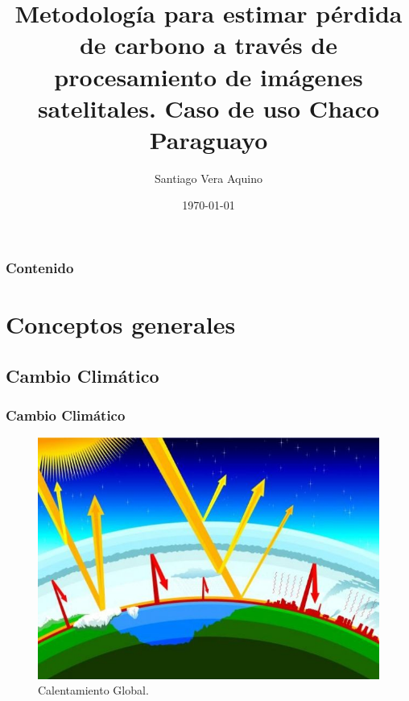 \documentclass[xcolor=table]{beamer}
\title[Perdida de Carbono]{Metodolog\'ia para estimar p\'erdida de
	carbono a trav\'es de procesamiento de im\'agenes
	satelitales. Caso de uso Chaco Paraguayo} %
\author{Santiago Vera Aquino} %
\institute[FP-UNA] %
{
Universidad Nacional de Asunci\'on \\ %
Facultad Polit\'ecnica \\
Ingenier\'ia en Inform\'atica \\
\medskip
\textit{Proyecto Final de grado} %
}
\date{\today} %
\begin{document}
\begin{frame}
\titlepage %
\end{frame}


	\begin{frame}
		\frametitle{Contenido}
\tableofcontents %
	\end{frame}
	
	\section{Conceptos generales}
	\subsection{Cambio Clim\'atico}
	\begin{frame}
		\frametitle{Cambio Clim\'atico}
		
			    \begin{figure}
			    	\centering
			    	\includegraphics[width=0.7\linewidth]{imagenes/cap2/calentamientoGlobal}
			    	\caption{Calentamiento Global.}
			    	\label{fig:calentamientoGlobal}
			    \end{figure}
	\end{frame}
	
\end{document}
